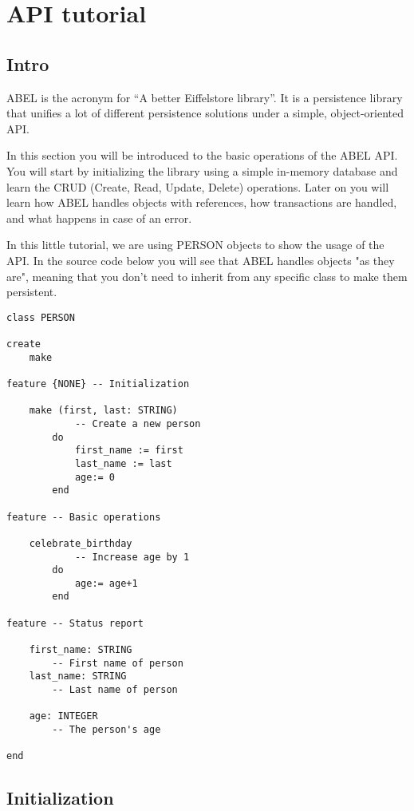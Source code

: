 \section{API tutorial}

\subsection{Intro}

ABEL is the acronym for ``A better Eiffelstore library''.
It is a persistence library that unifies a lot of different persistence solutions under a simple, object-oriented API.

In this section you will be introduced to the basic operations of the ABEL API. 
You will start by initializing the library using a simple in-memory database and learn the CRUD (Create, Read, Update, Delete) operations.
Later on you will learn how ABEL handles objects with references, how transactions are handled, and what happens in case of an error.

In this little tutorial, we are using PERSON objects to show the usage of the API.
In the source code below you will see that ABEL handles objects "as they are", meaning that you don't need to inherit from any specific class to make them persistent.

\begin{lstlisting}[language=OOSC2Eiffel, captionpos=b, caption={The PERSON class}, label={lst:simple_insert}]
class PERSON

create
	make

feature {NONE} -- Initialization

	make (first, last: STRING)
			-- Create a new person
		do
			first_name := first
			last_name := last
			age:= 0
		end

feature -- Basic operations

	celebrate_birthday
			-- Increase age by 1
		do
			age:= age+1
		end

feature -- Status report

	first_name: STRING
		-- First name of person
	last_name: STRING
		-- Last name of person

	age: INTEGER
		-- The person's age

end

\end{lstlisting}





\subsection{Initialization}

